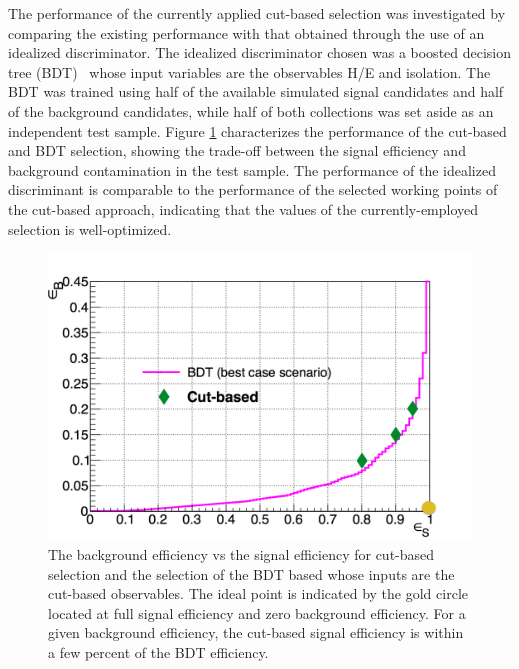 The performance of the currently applied cut-based selection was investigated by comparing the existing performance with that obtained through the use of an idealized discriminator. The idealized discriminator chosen was a boosted decision tree (BDT)~\cite{Hocker:2007ht} whose input variables are the observables H/E and isolation. The BDT was trained using half of the available simulated signal candidates and half of the background candidates, while half of both collections was set aside as an independent test sample. Figure \ref{fig:ECALMva1} characterizes the performance of the cut-based and BDT selection, showing the trade-off between the signal efficiency and background contamination in the test sample. The performance of the idealized discriminant is comparable to the performance of the selected working points of the cut-based approach, indicating that the values of the currently-employed selection is well-optimized. 
\begin{figure}[h]
\centering
  \includegraphics[width=0.79\linewidth]{figures/CMS/ECALMva1.png}
\caption{The background efficiency vs the signal efficiency for cut-based selection and the selection of the BDT based whose inputs are the cut-based observables. The ideal point is indicated by the gold circle located at full signal efficiency and zero background efficiency. For a given background efficiency, the cut-based signal efficiency is within a few percent of the BDT efficiency.}
\label{fig:ECALMva1}
\end{figure}

